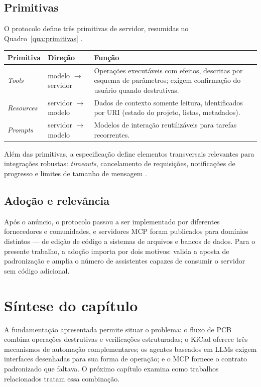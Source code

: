 \subsection{Primitivas}

O protocolo define três primitivas de servidor, resumidas no
Quadro~\ref{qua:primitivas} \citep{mcp2025docs}.

\begin{quadro}[htbp]
\centering
\small
\caption{Primitivas do MCP.}
\label{qua:primitivas}
\begin{tabular}{@{}p{2.4cm}p{3.4cm}p{8.4cm}@{}}
\toprule
\textbf{Primitiva} & \textbf{Direção} & \textbf{Função} \\
\midrule
\emph{Tools} & modelo $\rightarrow$ servidor & Operações executáveis com
efeitos, descritas por esquema de parâmetros; exigem confirmação do usuário
quando destrutivas. \\
\emph{Resources} & servidor $\rightarrow$ modelo & Dados de contexto somente
leitura, identificados por URI (estado do projeto, listas, metadados). \\
\emph{Prompts} & servidor $\rightarrow$ modelo & Modelos de interação
reutilizáveis para tarefas recorrentes. \\
\bottomrule
\end{tabular}
\end{quadro}

Além das primitivas, a especificação define elementos transversais relevantes
para integrações robustas: \emph{timeouts}, cancelamento de requisições,
notificações de progresso e limites de tamanho de mensagem
\citep{mcp2025spec}.

\subsection{Adoção e relevância}

Após o anúncio, o protocolo passou a ser implementado por diferentes
fornecedores e comunidades, e servidores MCP foram publicados para domínios
distintos --- de edição de código a sistemas de arquivos e bancos de dados.
Para o presente trabalho, a adoção importa por dois motivos: valida a aposta
de padronização e amplia o número de assistentes capazes de consumir o
servidor sem código adicional.

\section{Síntese do capítulo}

A fundamentação apresentada permite situar o problema: o fluxo de PCB combina
operações destrutivas e verificações estruturadas; o KiCad oferece três
mecanismos de automação complementares; os agentes baseados em LLMs exigem
interfaces desenhadas para sua forma de operação; e o MCP fornece o contrato
padronizado que faltava. O próximo capítulo examina como trabalhos
relacionados tratam essa combinação.
